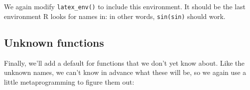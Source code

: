 \begin{Shaded}
\begin{Highlighting}[]
\StringTok{ }\NormalTok{(}\CharTok{\textbackslash{}\textbackslash{}}\NormalTok{, }\NormalTok{)}
\StringTok{ }\NormalTok{(}\CharTok{\textbackslash{}\textbackslash{}}\NormalTok{, }\NormalTok{)}
\end{Highlighting}
\end{Shaded}

We again modify \texttt{latex\_env()} to include this environment. It
should be the last environment R looks for names in: in other words,
\texttt{sin(sin)} should work.

\begin{Shaded}
\begin{Highlighting}[]
\StringTok{ }

  \StringTok{ }
  \StringTok{ }\NormalTok{(}
  \StringTok{ } 

  \StringTok{ } 
\NormalTok{\}}

\NormalTok{(}\StringTok{ }
\NormalTok{(}\StringTok{ }\NormalTok{))}
\NormalTok{(}
\end{Highlighting}
\end{Shaded}

\subsection{Unknown functions}

Finally, we'll add a default for functions that we don't yet know about.
Like the unknown names, we can't know in advance what these will be, so
we again use a little metaprogramming to figure them out:

